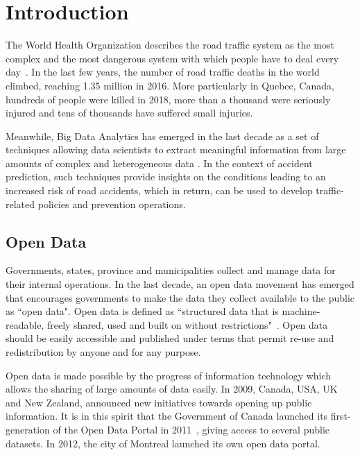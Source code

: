 \documentclass[conference]{IEEEtran}
\begin{document}

\section{Introduction}

The World Health Organization describes the road traffic system as the most
complex and the most dangerous system with which people have to deal every
day~\cite{Peden2004}. In the last few years, the number of road traffic deaths in the world climbed, reaching 1.35 million in 2016\cite{road_safety_report}. More particularly in Quebec, Canada, hundreds of people were killed in 2018, more than a thousand were seriously injured and tens of thousands have suffered small injuries\cite{saaq}.

Meanwhile, Big Data Analytics has emerged in the last decade as a set of techniques allowing data scientists to extract meaningful information from large amounts of complex and heterogeneous data \cite{Gandomi2015}. In the context of accident prediction, such techniques provide insights on the conditions leading to an increased risk of road accidents, which in return, can be used to develop traffic-related policies and prevention operations. 


\subsection{Open Data}

Governments, states, province and municipalities collect and manage data for their internal operations. In the last decade, an open data movement has emerged that encourages governments to make the data they collect available to the public as ``open data".
Open data is defined as ``structured data that is machine-readable, freely shared, used and built on without restrictions"~\cite{opendata101}. Open data should be easily accessible and published under terms that permit re-use and redistribution by anyone and for any purpose.

Open data is made possible by the progress of information technology which allows the sharing of large amounts of data easily. In 2009, Canada, USA, UK and New Zealand, announced new initiatives towards opening up public information. It is in this spirit that the Government of Canada launched its first-generation of the Open Data Portal in 2011~\cite{opendata101}, giving access to several public datasets. In 2012, the city of Montreal launched its own open data portal.
\end{document}
